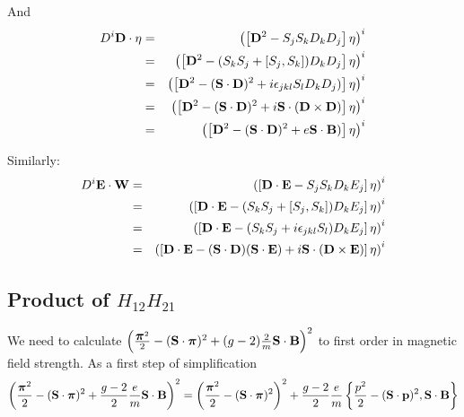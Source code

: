 And
\begin{eqnarray*}
 D^i \mathbf{D} \cdot \mathbf{\eta}
	&=& \left( \left[\mathbf{D}^2  - S_j S_k D_k D_j\right] \mathbf{\eta} \right)^i		\\
	&=& \left( \left[\mathbf{D}^2  - (S_k S_j + [S_j, S_k]) D_k D_j\right] \mathbf{\eta} \right)^i		\\
	&=& \left( \left[\mathbf{D}^2  - (\mathbf{S} \cdot \mathbf{D})^2 + i\epsilon_{jkl} S_l D_k D_j )\right] \mathbf{\eta} \right)^i		\\
	&=& \left( \left[\mathbf{D}^2  - (\mathbf{S} \cdot \mathbf{D})^2 + i\mathbf{S} \cdot (\mathbf{D} \times \mathbf{D})  \right] \mathbf{\eta} \right)^i		\\
	&=& \left( \left[\mathbf{D}^2  - (\mathbf{S} \cdot \mathbf{D})^2 + e \mathbf{S} \cdot \mathbf{B})  \right] \mathbf{\eta} \right)^i		\\
\end{eqnarray*}

Similarly:
\begin{eqnarray*}
 D^i \mathbf{E} \cdot \mathbf{W}
	&=& \left( \left[\mathbf{D} \cdot \mathbf{E}  - S_j S_k D_k E_j\right] \mathbf{\eta} \right)^i		\\
	&=& \left( \left[\mathbf{D} \cdot \mathbf{E}  -  (S_k S_j + [S_j, S_k]) D_k E_j \right] \mathbf{\eta} \right)^i		\\
	&=& \left( \left[\mathbf{D} \cdot \mathbf{E}  -  (S_k S_j +i\epsilon_{jkl} S_l) D_k E_j \right] \mathbf{\eta} \right)^i		\\
	&=& \left( \left[\mathbf{D} \cdot \mathbf{E}  - (\mathbf{S} \cdot \mathbf{D})(\mathbf{S} \cdot \mathbf{E}) + i \mathbf{S} \cdot (\mathbf{D} \times \mathbf{E})\right] \mathbf{\eta} \right)^i		\\
\end{eqnarray*}	

\subsection*{Product of $H_{12}H_{21}$}
We need to calculate $\left(  \frac {\mbox{\boldmath$ \pi $}^2} {2} -  (\mathbf{S} \cdot \mbox{\boldmath$ \pi $})^2 + (g-2)\frac{2}{m} \mathbf{S} \cdot \mathbf{B} \right )^2 $ to first order in magnetic field strength.  As a first step of simplification
\[
\left(  \frac {\mbox{\boldmath$ \pi $}^2} {2} -  (\mathbf{S} \cdot \mbox{\boldmath$ \pi $})^2 + \frac{g-2}{2}\frac{e}{m} \mathbf{S} \cdot \mathbf{B} \right )^2 
	=	\left(  \frac {\mbox{\boldmath$ \pi $}^2} {2} -  (\mathbf{S} \cdot \mbox{\boldmath$ \pi $})^2  \right )^2 
		 +\frac{g-2}{2}\frac{e}{m} \left \{ \frac{p^2}{2} - (\mathbf{S} \cdot \mathbf{p})^2, \mathbf{S} \cdot \mathbf{B} \right \}
\]	

